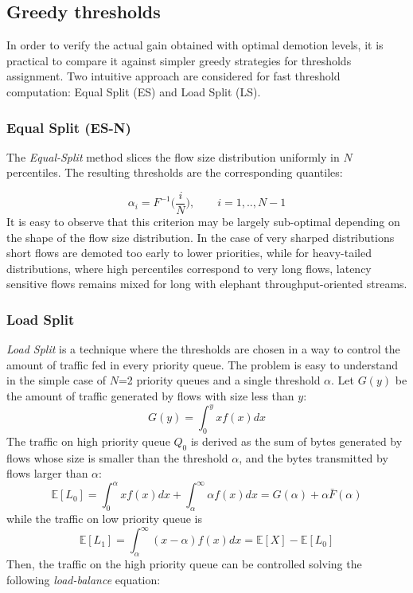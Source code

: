 \subsection{Greedy thresholds}
\label{sec:greedy-thresh}
In order to verify the actual gain obtained with optimal demotion levels, it is practical to compare it against simpler greedy strategies for thresholds assignment. Two intuitive approach are considered for fast threshold computation: Equal Split (ES) and Load Split (LS). 

\subsubsection{Equal Split (ES-N)}
The \textit{Equal-Split} method slices the flow size distribution uniformly in $N$ percentiles. The resulting thresholds are the corresponding quantiles:

\[
\alpha_{i} = F^{-1}\Big(\dfrac{i}{N}\Big), \qquad i=1,..,N-1
\]
It is easy to observe that this criterion may be largely sub-optimal depending on the shape of the flow size distribution. In the case of very sharped distributions short flows are demoted too early to lower priorities, while for heavy-tailed distributions, where high percentiles correspond to very long flows, latency sensitive flows remains mixed for long with elephant throughput-oriented streams.

\subsubsection{Load Split}
\emph{Load Split} is a technique where the thresholds are chosen in a way to control the amount of traffic fed in every priority queue.  The problem is easy to understand in the simple case of $N$=2 priority queues and a single threshold $\alpha$. Let $G(y)$ be the amount of traffic generated by flows with size less than $y$:
\[
G(y) = \int_{0}^y x f(x) dx
\]
The traffic on high priority queue $Q_0$ is derived as the sum of bytes generated by flows whose size is smaller than the threshold $\alpha$, and the bytes transmitted by flows larger than $\alpha$:
\[
\mathbb{E}[L_0] = \int_0^\alpha xf(x)dx+\int_\alpha^\infty \alpha f(x) dx=G(\alpha)+\alpha \bar{F}(\alpha)
\]
while the traffic on low priority queue is
\begin{equation*}
\mathbb{E}[L_1] =\int_\alpha^\infty (x-\alpha)f(x)dx=\mathbb{E}[X]-	\mathbb{E}[L_0]
\end{equation*}
Then, the traffic on the high priority queue can be controlled solving the following \textit{load-balance} equation:

